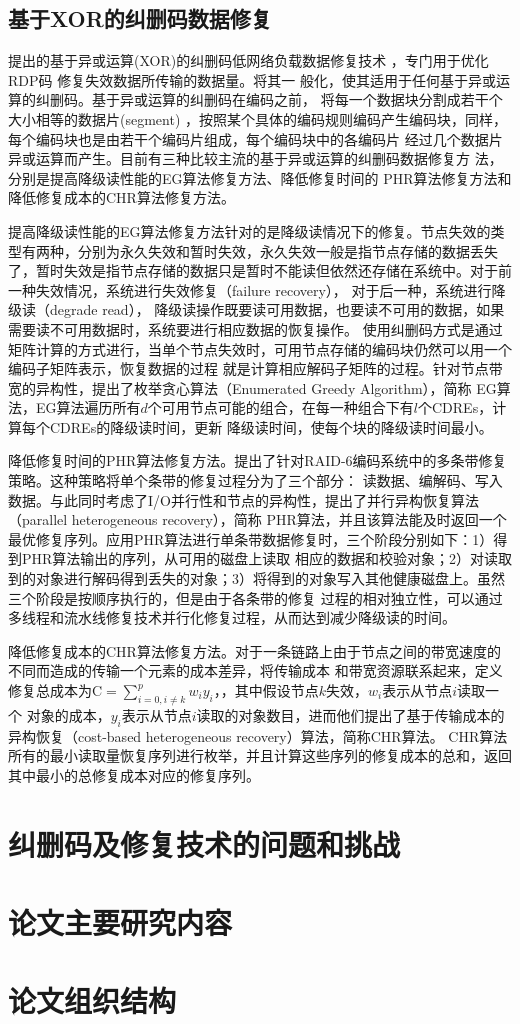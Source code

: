 \subsection{基于XOR的纠删码数据修复}

\citet{xiang2010optimal}提出的基于异或运算(XOR)的纠删码低网络负载数据修复技术
，专门用于优化RDP码\cite{corbett2004row}
修复失效数据所传输的数据量。\citet{khan2012rethinking}将其一
般化，使其适用于任何基于异或运算的纠删码。基于异或运算的纠删码在编码之前，
将每一个数据块分割成若干个大小相等的数据片(segment)
，按照某个具体的编码规则编码产生编码块，同样，每个编码块也是由若干个编码片组成，每个编码块中的各编码片
经过几个数据片异或运算而产生。目前有三种比较主流的基于异或运算的纠删码数据修复方
法，分别是提高降级读性能的EG算法修复方法、降低修复时间的
PHR算法修复方法和降低修复成本的CHR算法修复方法。

提高降级读性能的EG算法修复方法针对的是降级读情况下的修复。节点失效的类型有两种，分别为永久失效和暂时失效，永久失效一般是指节点存储的数据丢失
了，暂时失效是指节点存储的数据只是暂时不能读但依然还存储在系统中。对于前一种失效情况，系统进行失效修复（failure recovery），
对于后一种，系统进行降级读（degrade read），
降级读操作既要读可用数据，也要读不可用的数据，如果需要读不可用数据时，系统要进行相应数据的恢复操作。
使用纠删码方式是通过矩阵计算的方式进行，当单个节点失效时，可用节点存储的编码块仍然可以用一个编码子矩阵表示，恢复数据的过程
就是计算相应解码子矩阵的过程。针对节点带宽的异构性，\citet{zhu2014boosting}提出了枚举贪心算法（Enumerated Greedy Algorithm），简称
EG算法，EG算法遍历所有$d$个可用节点可能的组合，在每一种组合下有$l$个CDREs，计算每个CDREs的降级读时间，更新
降级读时间，使每个块的降级读时间最小。

降低修复时间的PHR算法修复方法。\citet{niu2013phr}提出了针对RAID-6编码系统中的多条带修复策略。这种策略将单个条带的修复过程分为了三个部分：
读数据、编解码、写入数据。与此同时考虑了I/O并行性和节点的异构性，提出了并行异构恢复算法（parallel heterogeneous recovery），简称
PHR算法，并且该算法能及时返回一个最优修复序列。应用PHR算法进行单条带数据修复时，三个阶段分别如下：1）得到PHR算法输出的序列，从可用的磁盘上读取
相应的数据和校验对象；2）对读取到的对象进行解码得到丢失的对象；3）将得到的对象写入其他健康磁盘上。虽然三个阶段是按顺序执行的，但是由于各条带的修复
过程的相对独立性，可以通过多线程和流水线修复技术并行化修复过程，从而达到减少降级读的时间。

降低修复成本的CHR算法修复方法。对于一条链路上由于节点之间的带宽速度的不同而造成的传输一个元素的成本差异，\citet{zhu2012cost}将传输成本
和带宽资源联系起来，定义修复总成本为$\mathrm{C}=\sum_{i=0, i \neq k}^{p} w_{i} y_{i}$，，其中假设节点$k$失效，$w_i$表示从节点$i$读取一个
对象的成本，$y_i$表示从节点$i$读取的对象数目，进而他们提出了基于传输成本的异构恢复（cost-based heterogeneous recovery）算法，简称CHR算法。
CHR算法所有的最小读取量恢复序列进行枚举，并且计算这些序列的修复成本的总和，返回其中最小的总修复成本对应的修复序列。


\section{纠删码及修复技术的问题和挑战}

\section{论文主要研究内容}

\section{论文组织结构}

